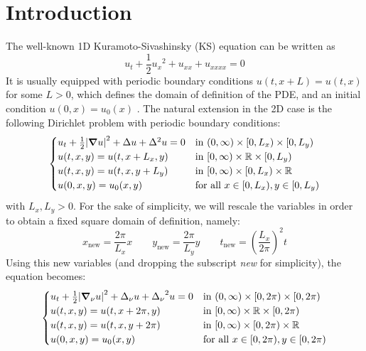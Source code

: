 \documentclass[twoside]{article}
\begin{document}
\section{Introduction}\label{sec:intro}
The well-known 1D Kuramoto-Sivashinsky (KS) equation can be written as
\begin{equation}
  u_t + \frac{1}{2} {u_x}^2 + u_{xx} + u_{xxxx} = 0
\end{equation}
It is usually equipped with periodic boundary conditions $u(t, x + L) = u(t, x)$ for some $L > 0$, which defines the domain of definition of the PDE, and an initial condition $u(0, x) = u_0(x)$ \cite{1d-ks}. The natural extension in the 2D case is the following Dirichlet problem with periodic boundary conditions:
\begin{equation}\label{eq:2d_ks_0}
  \begin{cases}
    u_t + \frac{1}{2} \abs{\grad u}^2 + \Delta u + \Delta^2 u = 0 & \text{in } (0, \infty) \times [0, L_x) \times [0, L_y) \\
    u(t, x, y) = u(t, x + L_x, y)                                         & \text{in } [0, \infty) \times \mathbb{R} \times [0, L_y)      \\
    u(t, x, y) = u(t, x, y + L_y)                                         & \text{in } [0, \infty) \times [0, L_x) \times \mathbb{R}      \\
    u(0, x, y) = u_0(x, y)                                                & \text{for all } x \in [0, L_x), y \in [0, L_y)
  \end{cases}
\end{equation}
with $L_x, L_y > 0$. For the sake of simplicity, we will rescale the variables in order to obtain a fixed square domain of definition, namely:
\begin{equation}
  x_\mathrm{new} = \frac{2\pi}{L_x} x \qquad y_\mathrm{new} = \frac{2\pi}{L_y} y \qquad t_\mathrm{new} = {\left(\frac{L_x}{2 \pi}\right)}^2 t
\end{equation}
Using this new variables (and dropping the subscript \emph{new} for simplicity), the equation becomes:
\begin{equation}\label{eq:2d_ks}
  \begin{cases}
    u_t + \frac{1}{2} \abs{\grad_\nu u}^2 + \Delta_\nu u + {\Delta_\nu}^2 u = 0 & \text{in } (0, \infty) \times [0, 2\pi) \times [0, 2\pi) \\
    u(t, x, y) = u(t, x + 2\pi, y)                                                      & \text{in } [0, \infty) \times \mathbb{R} \times [0, 2\pi)       \\
    u(t, x, y) = u(t, x, y + 2\pi)                                                      & \text{in } [0, \infty) \times [0, 2\pi) \times \mathbb{R}       \\
    u(0, x, y) = u_0(x, y)                                                              & \text{for all } x \in [0, 2\pi), y \in [0, 2\pi)
  \end{cases}
\end{equation}
\end{document}
